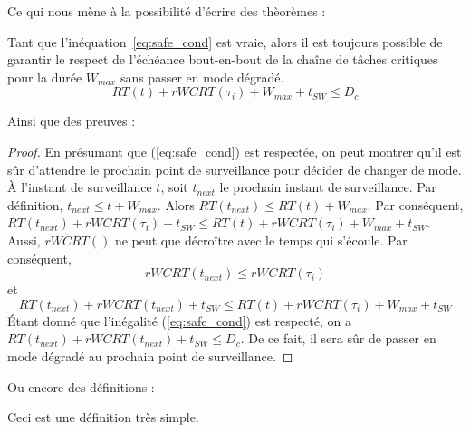 \documentclass[french, a4paper, 11pt, twoside, pdftex]{StyleThese}
\begin{document}
  		 Ce qui nous mène à la possibilité d'écrire des thèorèmes :

	\begin{theorem}
		Tant que l'inéquation~\ref{eq:safe_cond} est vraie, alors il est toujours possible de garantir le respect de l'échéance bout-en-bout de la chaîne de tâches critiques pour la durée $W_{max}$ sans passer en mode dégradé.
		\begin{equation} \label{eq:safe_cond}
			RT(t) + rWCRT(\tau_i) + W_{max} + t_{SW} \leq D_c
		\end{equation}
	\end{theorem}

Ainsi que des preuves :

    \begin{proof}
		En présumant que (\ref{eq:safe_cond}) est respectée, on peut montrer qu'il est sûr d'attendre le prochain point de surveillance pour décider de changer de mode. \nline
		À l'instant de surveillance $t$, soit $t_{next}$ le prochain instant de surveillance.\nline
		Par définition, $t_{next} \leq t + W_{max}$. Alors $RT(t_{next}) \leq RT(t) + W_{max}$.
		Par conséquent, \smallbreak
		$RT(t_{next}) + rWCRT(\tau_i) + t_{SW} \leq RT(t) + rWCRT(\tau_i) + W_{max} + t_{SW}$. \nline
		Aussi, $rWCRT()$ ne peut que décroître avec le temps qui s'écoule. Par conséquent, %
		\[ rWCRT(t_{next}) \leq rWCRT(\tau_i)	\]
		et
		\[ RT(t_{next}) + rWCRT(t_{next}) + t_{SW} \leq RT(t) + rWCRT(\tau_i) + W_{max} + t_{SW} \]
		Étant donné que l'inégalité (\ref{eq:safe_cond}) est respecté, on a $RT(t_{next}) + rWCRT(t_{next}) + t_{SW} \leq D_c$.
		De ce fait, il sera sûr de passer en mode dégradé au prochain point de surveillance.
    \end{proof}
    Ou encore des définitions :

    \begin{definition}
        Ceci est une définition très simple.
    \end{definition}




\ifdefined{}
\else


\end{document}
